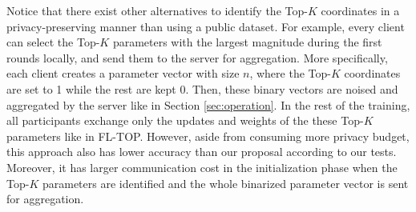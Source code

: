 \documentclass[accepted]{uai2021} %
\newcommand{\TOPK}{Top-$K$\xspace}
\begin{document}

Notice that there exist other alternatives to identify the \TOPK coordinates in a privacy-preserving manner than using a public dataset. For example, every client can select the \TOPK parameters with the largest magnitude during the first rounds locally, and send them to the server for aggregation. More specifically,
each client creates a parameter vector with size $n$, where the \TOPK coordinates are set to 1 while the rest are kept 0. Then, these binary vectors are noised and aggregated by the server like in Section \ref{sec:operation}. In the rest of the training, all participants exchange only the updates and weights of the these \TOPK parameters like in FL-TOP.
However, aside from consuming more privacy budget, this approach also has lower accuracy than our proposal according to our tests. Moreover, it has larger communication cost in the initialization phase when the \TOPK parameters are identified and the whole binarized parameter vector is sent for aggregation. 



\end{document}
